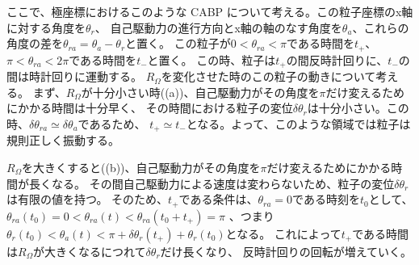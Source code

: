 \documentclass[/Users/ikedahajime/GitHub/reserch/master_report/thesis]{subfiles}
\begin{document}
ここで、極座標におけるこのような CABP について考える。この粒子座標のx軸に対する角度を$\theta_r$、
自己駆動力の進行方向とx軸の軸のなす角度を$\theta_a$、これらの角度の差を$\theta_{ra}=\theta_a-\theta_r$と置く。
この粒子が$0<\theta_{ra}<\pi$である時間を$t_{+}$、$\pi < \theta_{ra}<2\pi$である時間を$t_{-}$と置く。
この時、粒子は$t_+$の間反時計回りに、$t_-$の間は時計回りに運動する。
$R_\Omega$を変化させた時のこの粒子の動きについて考える。
まず、$R_\Omega$が十分小さい時((a))、自己駆動力がその角度を$\pi$だけ変えるためにかかる時間は十分早く、
その時間における粒子の変位$\delta \theta_r$は十分小さい。この時、$\delta \theta_{ra}\simeq\delta \theta_a$であるため、
$t_+\simeq t_-$となる。よって、このような領域では粒子は規則正しく振動する。

$R_\Omega$を大きくすると((b))、自己駆動力がその角度を$\pi$だけ変えるためにかかる時間が長くなる。
その間自己駆動力による速度は変わらないため、粒子の変位$\delta \theta_r$は有限の値を持つ。
そのため、$t_+$である条件は、$\theta_{ra}=0$である時刻を$t_0$として、$\theta_{ra}(t_0)=0<\theta_{ra}(t)<\theta_{ra}(t_0+t_+)=\pi$
、つまり$\theta_{r}(t_0)<\theta_a(t)<\pi+\delta\theta_r(t_+)+\theta_r(t_0)$となる。
これによって$t_+$である時間は$R_\Omega$が大きくなるにつれて$\delta \theta_r$だけ長くなり、
反時計回りの回転が増えていく。
\end{document}
